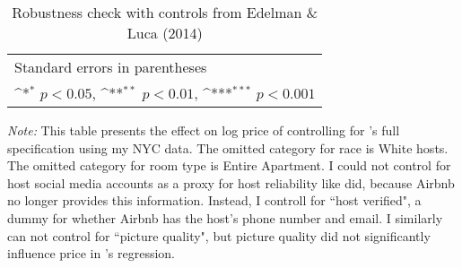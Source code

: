 \begin{table}[htbp]\centering
	\def\sym#1{\ifmmode^{#1}\else\(^{#1}\)\fi}
	
	\caption{Robustness check with controls from Edelman \& Luca (2014)}
	\begin{tabular}{l*{1}{c}}
		\hline\hline
		 
		\hline\hline
		\multicolumn{2}{l}{\footnotesize Standard errors in parentheses}\\
		\multicolumn{2}{l}{\footnotesize \sym{*} \(p<0.05\), \sym{**} \(p<0.01\), \sym{***} \(p<0.001\)}\\
	\end{tabular}
	\label{table:edelman}
	\begin{tablenotes}
		
		\item {\it Note:} This table presents the effect on log price of controlling for \cite{edelman}'s full specification using my NYC data. The omitted category for race is White hosts. The omitted category for room type is Entire Apartment. I could not control for host social media accounts as a proxy for host reliability like \cite{edelman} did, because Airbnb no longer provides this information. Instead, I controll for ``host verified", a dummy for whether Airbnb has the host's phone number and email. I similarly can not control for ``picture quality", but picture quality did not significantly influence price in \cite{edelman}'s regression.
		
	\end{tablenotes}
\end{table}


